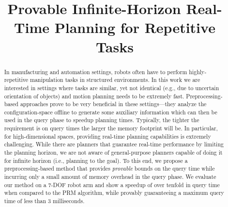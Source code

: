 \documentclass[letterpaper]{article} %
\begin{document}
%
\title{Provable Infinite-Horizon Real-Time Planning for Repetitive Tasks}
\maketitle

\begin{abstract}
In manufacturing and automation settings, robots often have to perform highly-repetitive manipulation tasks in structured environments. 
In this work we are interested in settings where tasks are similar, yet not identical (e.g., due to uncertain orientation of objects) and motion planning needs to be extremely fast. 
Preprocessing-based approaches prove to be very beneficial in these settings---they analyze the configuration-space offline to generate some auxiliary information which can then be used in the query phase to speedup planning times. 
%
Typically, the tighter the requirement is on query times the larger the memory footprint will be. In particular, for high-dimensional spaces, providing real-time planning capabilities is extremely challenging.
While there are planners that guarantee real-time performance by limiting the planning horizon, we are not aware of general-purpose planners capable of doing it for infinite horizon (i.e., planning to the goal).
%
To this end, we propose a preprocessing-based method that provides \emph{provable} bounds on the query time while incurring only a small amount of memory overhead in the query phase.
We evaluate our method on a 7-DOF robot arm and show a speedup of over tenfold in query time when compared to the \textsf{PRM} algorithm, while provably guaranteeing a maximum query time of less than 3 milliseconds.
\end{abstract}
\end{document}
